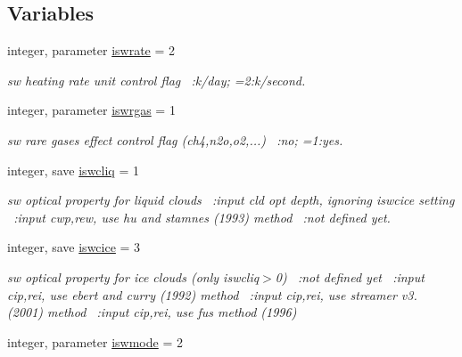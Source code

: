 \subsection*{Variables}
\begin{DoxyCompactItemize}
\item 
integer, parameter \hyperlink{namespacephysparam_a20514cb92f09ee6e32f2f1def570ace1}{iswrate} = 2
\begin{DoxyCompactList}\small\item\em sw heating rate unit control flag ~\+:k/day; =2\+:k/second. \end{DoxyCompactList}\item 
integer, parameter \hyperlink{namespacephysparam_a8782cc8df3a1d906c2ddb3d900468568}{iswrgas} = 1
\begin{DoxyCompactList}\small\item\em sw rare gases effect control flag (ch4,n2o,o2,...) ~\+:no; =1\+:yes. \end{DoxyCompactList}\item 
integer, save \hyperlink{namespacephysparam_a7ad8c8c5860089a86ef637429c7d4d27}{iswcliq} = 1
\begin{DoxyCompactList}\small\item\em sw optical property for liquid clouds ~\+:input cld opt depth, ignoring iswcice setting ~\+:input cwp,rew, use hu and stamnes (1993) method ~\+:not defined yet. \end{DoxyCompactList}\item 
integer, save \hyperlink{namespacephysparam_a7b5967eca1b21aa0d5ccd9531a6f8abb}{iswcice} = 3
\begin{DoxyCompactList}\small\item\em sw optical property for ice clouds (only iswcliq$>$0) ~\+:not defined yet ~\+:input cip,rei, use ebert and curry (1992) method ~\+:input cip,rei, use streamer v3. (2001) method ~\+:input cip,rei, use fu\textquotesingle{}s method (1996) \end{DoxyCompactList}\item 
integer, parameter \hyperlink{namespacephysparam_afe7d9a3a1e3cd4711675252a0921853b}{iswmode} = 2

\end{DoxyCompactItemize}

